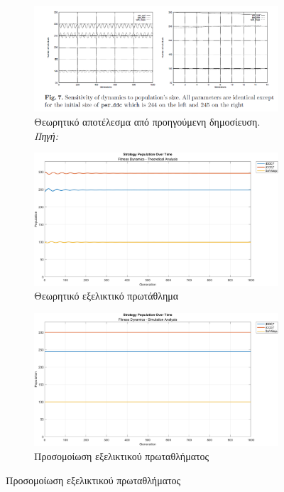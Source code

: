 \documentclass[12pt]{report}
\begin{document}
\begin{figure}[htbp]
    \centering

    \begin{subfigure}[b]{0.5\linewidth}
        \centering
        \includegraphics[width=\linewidth]{Figures Fitness Dynamics/7.png}
        \caption{Θεωρητικό αποτέλεσμα από προηγούμενη δημοσίευση. \textit{Πηγή:} \protect\cite{mathieu1999}}
        \label{fig:fig_fit_7_a}
    \end{subfigure}
    \hfill
    \begin{subfigure}[b]{0.5\linewidth}
        \centering
        \includegraphics[width=\linewidth]{Figures Fitness Dynamics/example7a.png}
        \caption{Θεωρητικό εξελικτικό πρωτάθλημα}
        \label{fig:fig_fit_7a_b}
    \end{subfigure}
    \hfill
    \begin{subfigure}[b]{0.5\linewidth}
        \centering
        \includegraphics[width=\linewidth]{Figures Fitness Dynamics/example7a-sim.png}
        \caption{Προσομοίωση εξελικτικού πρωταθλήματος}
        \label{fig:fig_fit_7a_c}
        

\end{subfigure}
\end{figure}
\end{document}
